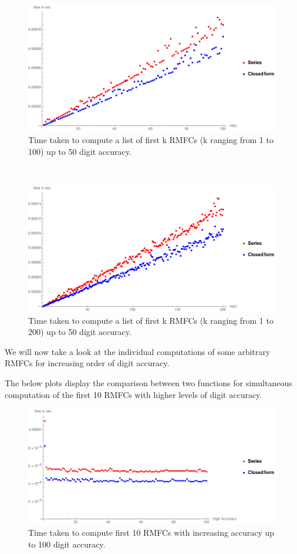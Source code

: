\documentclass[12pt]{article}
\numberwithin{equation}{section}
\begin{document}
\begin{figure}[!hbp]
    \centering
    \includegraphics[width=13cm]{Images/first100RMFCseriesvsclosedform.png}
    \caption{Time taken to compute a list of first k RMFCs (k ranging from 1 to 100) up to 50 digit accuracy.}
    \label{fig:timecompfirst100rmfcs}
\end{figure}\\
\begin{figure}[!hbp]
    \centering
    \includegraphics[width=13cm]{Images/first200RMFCseriesvsclosedform.png}
    \caption{Time taken to compute a list of first k RMFCs (k ranging from 1 to 200) up to 50 digit accuracy.}
    \label{fig:timecompfirst200rmfcs}
\end{figure}
\clearpage
We will now take a look at the individual computations of some arbitrary RMFCs for increasing order of digit accuracy.\par
The below plots display the comparison between two functions for simultaneous computation of the first 10 RMFCs with higher levels of digit accuracy.
\begin{figure}[!hbp]
    \centering
    \includegraphics[width=13cm]{Images/first100digitsaccuracy.png}
    \caption{Time taken to compute first 10 RMFCs with increasing accuracy up to 100 digit accuracy.}
    \label{fig:timecomp10rmfc100digit}
\end{figure}
\end{document}
